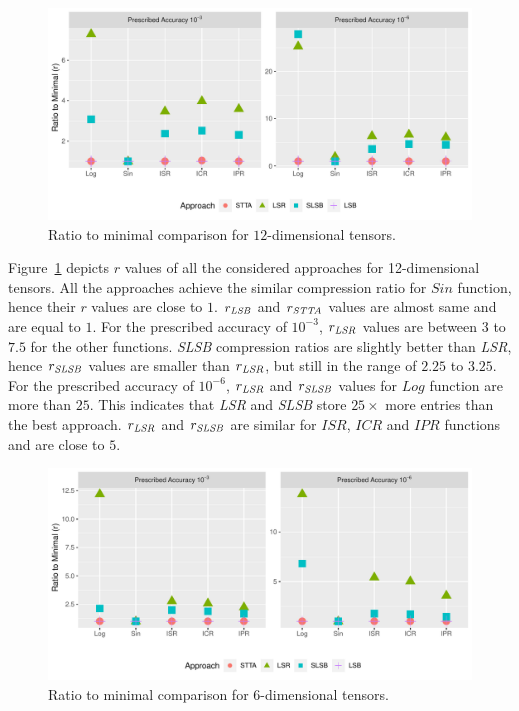 \documentclass[runningheads]{llncs}
\newcommand{\hfirst}{{\it LSR}\xspace}
\newcommand{\hsecond}{{\it SLSB}\xspace}
\newcommand{\hthird}{{\it LSB}\xspace}
\newcommand{\otta}{{\it STTA}\xspace}
\begin{document}
\begin{figure}[!htb]
	\begin{center}
		\includegraphics[scale=0.5]{./ratio_to_minimal-4-12.pdf}
	\end{center}
	\vspace*{-0.35cm}\caption{\small Ratio to minimal comparison for $12$-dimensional tensors.\label{fig:rtm-12}}
\end{figure}

Figure~\ref{fig:rtm-12} depicts $r$ values of all the considered approaches for 12-dimensional tensors. All the approaches achieve the similar compression ratio for $Sin$ function, hence their $r$ values are close to $1$. $r_ {\hthird}$ and $r_ {\otta}$ values are almost same and are equal to $1$. For the prescribed accuracy of $10^{-3}$, $r_ {\hfirst}$ values are between $3$ to $7.5$ for the other functions. \hsecond compression ratios are slightly better than \hfirst, hence $r_ {\hsecond}$ values are smaller than $r_ {\hfirst}$, but still in the range of $2.25$ to $3.25$. For the prescribed accuracy of $10^{-6}$, $r_ {\hfirst}$ and $r_ {\hsecond}$ values for $Log$ function are more than $25$. This indicates that \hfirst and \hsecond store $25\times$ more entries than the best approach. $r_ {\hfirst}$ and $r_ {\hsecond}$ are similar for $ISR$, $ICR$ and $IPR$ functions and are close to $5$. 

\begin{figure}[!htb]
	\begin{center}
		\includegraphics[scale=0.5]{./ratio_to_minimal-16-6.pdf}
	\end{center}
	\caption{Ratio to minimal comparison for $6$-dimensional tensors.\label{fig:rtm-6}\vspace*{-0.45cm}}
\end{figure}
\end{document}
